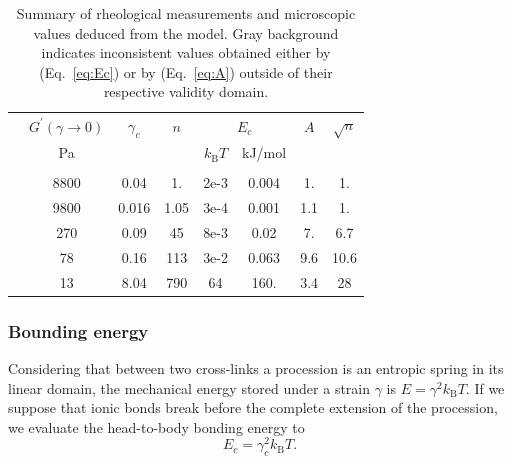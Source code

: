 \documentclass[journal=jacsat,manuscript=article]{achemso}
\begin{document}
\begin{table}
\begin{tabular}{l|SS|SSSSS}
& {$G^\prime(\gamma\rightarrow 0)$} & {$\gamma_c$} & {$n$} &  & {$A$} & {$\sqrt{n}$}\\
&	{\si{\pascal}} &  & & {$k_\mathrm{B}T$} & {\si{\kilo\joule/\mol}} & \\\hline&&&&&\\[-10pt]
	& 8800	&	0.04	&	1.	&	2e-3\cellcolor{gray!25}	&	0.004	&	1.	&	1.\\
	& 9800 	& 	0.016	&	1.05&	3e-4	&	0.001	&	1.1	&	1.\\
	& 270 	&	0.09	&	45	&	8e-3	&	0.02	&	7.	&	6.7\\
	& 78	&	0.16	&	113	&	3e-2	&	0.063	&	9.6	&	10.6\\
	& 13	&	8.04	&	790	&	64	&	160.	&	3.4	&	28\\
\end{tabular}
\caption{Summary of rheological measurements and microscopic values deduced from the model. Gray background indicates inconsistent values obtained either by (Eq.~\ref{eq:Ec}) or by (Eq.~\ref{eq:A}) outside of their respective validity domain.}
\label{tab:results}
\end{table}

\subsubsection{Bounding energy}

Considering that between two cross-links a procession is an entropic spring in its linear domain, the mechanical energy stored under a strain $\gamma$ is $E = \gamma^2 k_\mathrm{B}T$. If we suppose that ionic bonds break before the complete extension of the procession, we evaluate the head-to-body bonding energy to
\begin{equation}
E_c = \gamma_c^2 k_\mathrm{B}T.
\label{eq:Ec}
\end{equation}
\end{document}
